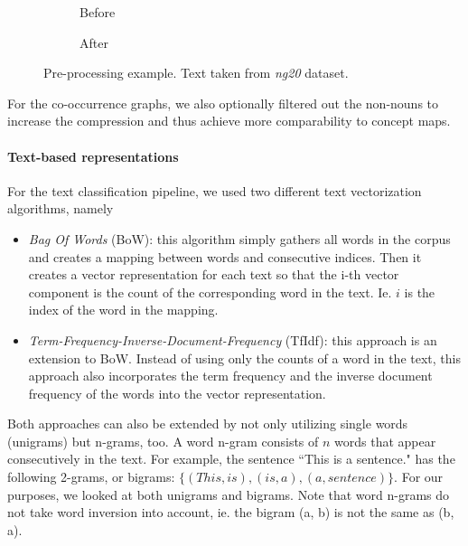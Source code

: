 \begin{figure}[ht!]
	\begin{subfigure}[b]{0.45\linewidth}
		
\noindent{}
    \caption{Before}
    \end{subfigure}
\hspace{0.5in}
	\begin{subfigure}[b]{0.45\linewidth}
\noindent{}
\vspace{0.5in}
    \caption{After}
    \end{subfigure}
	\caption{Pre-processing example. Text taken from \textit{ng20} dataset.}\label{fig:preprocessing_example}
\end{figure}

For the co-occurrence graphs, we also optionally filtered out the non-nouns to increase the compression and thus achieve more comparability to concept maps.

\paragraph{Text-based representations}
For the text classification pipeline, we used two different text vectorization algorithms, namely
\begin{itemize}
\item{\textit{Bag Of Words} (BoW): this algorithm simply gathers all words in the corpus and creates a mapping between words and consecutive indices. Then it creates a vector representation for each text so that the i-th vector component is the count of the corresponding word in the text. Ie. $i$ is the index of the word in the mapping.}
\item{\textit{Term-Frequency-Inverse-Document-Frequency} (TfIdf): this approach is an extension to BoW. Instead of using only the counts of a word in the text, this approach also incorporates the term frequency and the inverse document frequency of the words into the vector representation.}
\end{itemize}
Both approaches can also be extended by not only utilizing single words (unigrams) but n-grams, too. A word n-gram consists of $n$ words that appear consecutively in the text.
For example, the sentence ``This is a sentence." has the following 2-grams, or bigrams: $\{ (This, is), (is, a), (a, sentence) \}$.
For our purposes, we looked at both unigrams and bigrams.
Note that word n-grams do not take word inversion into account, ie. the bigram (a, b) is not the same as (b, a).

